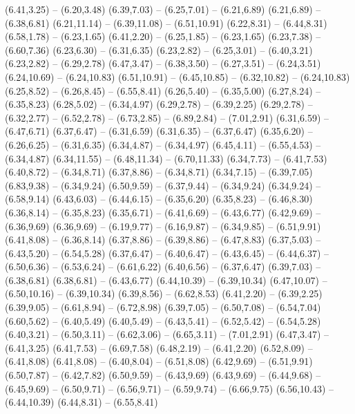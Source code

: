 {  (6.41,3.25) -- (6.20,3.48)
  (6.39,7.03) -- (6.25,7.01) -- (6.21,6.89)
  (6.21,6.89) -- (6.38,6.81)
  (6.21,11.14) -- (6.39,11.08) -- (6.51,10.91)
  (6.22,8.31) -- (6.44,8.31)
  (6.58,1.78) -- (6.23,1.65)
  (6.41,2.20) -- (6.25,1.85) -- (6.23,1.65)
  (6.23,7.38) -- (6.60,7.36)
  (6.23,6.30) -- (6.31,6.35)
  (6.23,2.82) -- (6.25,3.01) -- (6.40,3.21)
  (6.23,2.82) -- (6.29,2.78)
  (6.47,3.47) -- (6.38,3.50) -- (6.27,3.51) -- (6.24,3.51)
  (6.24,10.69) -- (6.24,10.83)
  (6.51,10.91) -- (6.45,10.85) -- (6.32,10.82) -- (6.24,10.83)
  (6.25,8.52) -- (6.26,8.45) -- (6.55,8.41)
  (6.26,5.40) -- (6.35,5.00)
  (6.27,8.24) -- (6.35,8.23)
  (6.28,5.02) -- (6.34,4.97)
  (6.29,2.78) -- (6.39,2.25)
  (6.29,2.78) -- (6.32,2.77) -- (6.52,2.78) -- (6.73,2.85) -- (6.89,2.84) -- (7.01,2.91)
  (6.31,6.59) -- (6.47,6.71)
  (6.37,6.47) -- (6.31,6.59)
  (6.31,6.35) -- (6.37,6.47)
  (6.35,6.20) -- (6.26,6.25) -- (6.31,6.35)
  (6.34,4.87) -- (6.34,4.97)
  (6.45,4.11) -- (6.55,4.53) -- (6.34,4.87)
  (6.34,11.55) -- (6.48,11.34) -- (6.70,11.33)
  (6.34,7.73) -- (6.41,7.53)
  (6.40,8.72) -- (6.34,8.71)
  (6.37,8.86) -- (6.34,8.71)
  (6.34,7.15) -- (6.39,7.05)
  (6.83,9.38) -- (6.34,9.24)
  (6.50,9.59) -- (6.37,9.44) -- (6.34,9.24)
  (6.34,9.24) -- (6.58,9.14)
  (6.43,6.03) -- (6.44,6.15) -- (6.35,6.20)
  (6.35,8.23) -- (6.46,8.30)
  (6.36,8.14) -- (6.35,8.23)
  (6.35,6.71) -- (6.41,6.69) -- (6.43,6.77)
  (6.42,9.69) -- (6.36,9.69)
  (6.36,9.69) -- (6.19,9.77) -- (6.16,9.87) -- (6.34,9.85) -- (6.51,9.91)
  (6.41,8.08) -- (6.36,8.14)
  (6.37,8.86) -- (6.39,8.86) -- (6.47,8.83)
  (6.37,5.03) -- (6.43,5.20) -- (6.54,5.28)
  (6.37,6.47) -- (6.40,6.47) -- (6.43,6.45) -- (6.44,6.37) -- (6.50,6.36) -- (6.53,6.24) -- (6.61,6.22)
  (6.40,6.56) -- (6.37,6.47)
  (6.39,7.03) -- (6.38,6.81)
  (6.38,6.81) -- (6.43,6.77)
  (6.44,10.39) -- (6.39,10.34)
  (6.47,10.07) -- (6.50,10.16) -- (6.39,10.34)
  (6.39,8.56) -- (6.62,8.53)
  (6.41,2.20) -- (6.39,2.25)
  (6.39,9.05) -- (6.61,8.94) -- (6.72,8.98)
  (6.39,7.05) -- (6.50,7.08) -- (6.54,7.04)
  (6.60,5.62) -- (6.40,5.49)
  (6.40,5.49) -- (6.43,5.41) -- (6.52,5.42) -- (6.54,5.28)
  (6.40,3.21) -- (6.50,3.11) -- (6.62,3.06) -- (6.65,3.11) -- (7.01,2.91)
  (6.47,3.47) -- (6.41,3.25)
  (6.41,7.53) -- (6.69,7.58)
  (6.48,2.19) -- (6.41,2.20)
  (6.52,8.09) -- (6.41,8.08)
  (6.41,8.08) -- (6.40,8.04) -- (6.51,8.08)
  (6.42,9.69) -- (6.51,9.91)
  (6.50,7.87) -- (6.42,7.82)
  (6.50,9.59) -- (6.43,9.69)
  (6.43,9.69) -- (6.44,9.68) -- (6.45,9.69) -- (6.50,9.71) -- (6.56,9.71) -- (6.59,9.74) -- (6.66,9.75)
  (6.56,10.43) -- (6.44,10.39)
  (6.44,8.31) -- (6.55,8.41)
}
